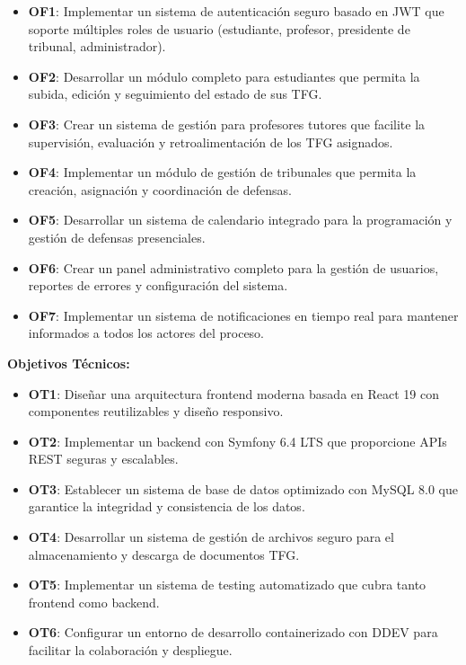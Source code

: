 \documentclass[12pt,a4paper,oneside]{report}
\providecommand{\tightlist}{%
  \setlength{\itemsep}{0pt}\setlength{\parskip}{0pt}}
\begin{document}
\begin{itemize}
\tightlist
\item
  \textbf{OF1}: Implementar un sistema de autenticación seguro basado en
  JWT que soporte múltiples roles de usuario (estudiante, profesor,
  presidente de tribunal, administrador).
\item
  \textbf{OF2}: Desarrollar un módulo completo para estudiantes que
  permita la subida, edición y seguimiento del estado de sus TFG.
\item
  \textbf{OF3}: Crear un sistema de gestión para profesores tutores que
  facilite la supervisión, evaluación y retroalimentación de los TFG
  asignados.
\item
  \textbf{OF4}: Implementar un módulo de gestión de tribunales que
  permita la creación, asignación y coordinación de defensas.
\item
  \textbf{OF5}: Desarrollar un sistema de calendario integrado para la
  programación y gestión de defensas presenciales.
\item
  \textbf{OF6}: Crear un panel administrativo completo para la gestión
  de usuarios, reportes de errores y configuración del sistema.
\item
  \textbf{OF7}: Implementar un sistema de notificaciones en tiempo real
  para mantener informados a todos los actores del proceso.
\end{itemize}

\textbf{Objetivos Técnicos:}

\begin{itemize}
\tightlist
\item
  \textbf{OT1}: Diseñar una arquitectura frontend moderna basada en
  React 19 con componentes reutilizables y diseño responsivo.
\item
  \textbf{OT2}: Implementar un backend con Symfony 6.4 LTS que
  proporcione APIs REST seguras y escalables.
\item
  \textbf{OT3}: Establecer un sistema de base de datos optimizado con
  MySQL 8.0 que garantice la integridad y consistencia de los datos.
\item
  \textbf{OT4}: Desarrollar un sistema de gestión de archivos seguro
  para el almacenamiento y descarga de documentos TFG.
\item
  \textbf{OT5}: Implementar un sistema de testing automatizado que cubra
  tanto frontend como backend.
\item
  \textbf{OT6}: Configurar un entorno de desarrollo containerizado con
  DDEV para facilitar la colaboración y despliegue.
\end{itemize}
\end{document}
